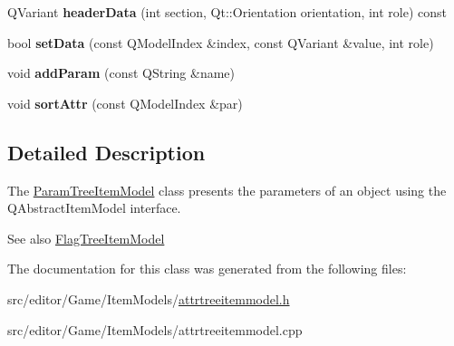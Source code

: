\begin{DoxyCompactItemize}
\item 
\hypertarget{class_param_tree_item_model_ae59b1c5b5786ab383c5541d5129408a9}{\-Q\-Variant {\bfseries header\-Data} (int section, \-Qt\-::\-Orientation orientation, int role) const }\label{class_param_tree_item_model_ae59b1c5b5786ab383c5541d5129408a9}

\item 
\hypertarget{class_param_tree_item_model_a11957b48dec60550a4446f22ba6ef7dc}{bool {\bfseries set\-Data} (const \-Q\-Model\-Index \&index, const \-Q\-Variant \&value, int role)}\label{class_param_tree_item_model_a11957b48dec60550a4446f22ba6ef7dc}

\item 
\hypertarget{class_param_tree_item_model_a207a117e7c2381d58d6f8f49d466bfd9}{void {\bfseries add\-Param} (const \-Q\-String \&name)}\label{class_param_tree_item_model_a207a117e7c2381d58d6f8f49d466bfd9}

\item 
\hypertarget{class_param_tree_item_model_a5d4e95b0a2806773ef319cec22f8f551}{void {\bfseries sort\-Attr} (const \-Q\-Model\-Index \&par)}\label{class_param_tree_item_model_a5d4e95b0a2806773ef319cec22f8f551}

\end{DoxyCompactItemize}


\subsection{\-Detailed \-Description}
\-The \hyperlink{class_param_tree_item_model}{\-Param\-Tree\-Item\-Model} class presents the parameters of an object using the \-Q\-Abstract\-Item\-Model interface. 

\begin{DoxySeeAlso}{\-See also}
\hyperlink{class_flag_tree_item_model}{\-Flag\-Tree\-Item\-Model} 
\end{DoxySeeAlso}


\-The documentation for this class was generated from the following files\-:\begin{DoxyCompactItemize}
\item 
src/editor/\-Game/\-Item\-Models/\hyperlink{attrtreeitemmodel_8h}{attrtreeitemmodel.\-h}\item 
src/editor/\-Game/\-Item\-Models/attrtreeitemmodel.\-cpp\end{DoxyCompactItemize}
